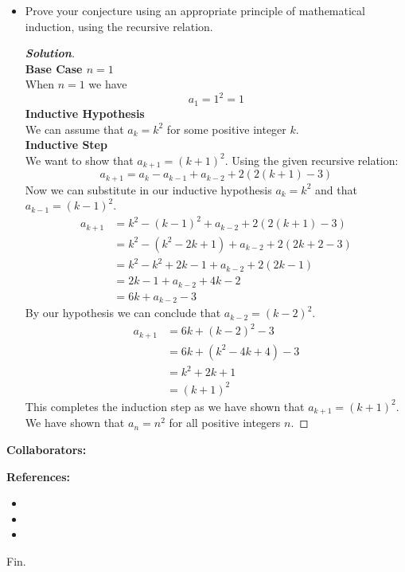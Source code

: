 \documentclass[11pt]{article}
\newenvironment{problem}[2][Problem\!]{\begin{trivlist}
\item[\hskip \labelsep {\bfseries #1}\hskip \labelsep {\bfseries #2.}]}{\end{trivlist}}
\newenvironment{solution}{\begin{proof}[\textbf{\textit{Solution}}]}{\end{proof}}
\begin{document}
\begin{problem}{6.2}
\begin{itemize}[itemsep=3em]
\item[(c)] Prove your conjecture using an appropriate principle of mathematical induction, using the recursive relation.
\begin{solution}\hfill %
\\
\textbf{Base Case \(n = 1\)}\\
When \(n = 1\) we have 
\[a_1 = 1^2 = 1\]
\textbf{Inductive Hypothesis}\\
We can assume that \(a_k = k^2\) for some positive integer \(k\).\\
\textbf{Inductive Step}\\
We want to show that \(a_{k+1} = (k+1)^2\). Using the given recursive relation:
\[a_{k+1} = a_k - a_{k-1} + a_{k-2} + 2(2(k+1)-3)\]
Now we can substitute in our inductive hypothesis \(a_k = k^2\) and that \(a_{k-1} = (k-1)^2\).
\begin{align*}
a_{k+1} &= k^2-(k-1)^2+a_{k-2}+2(2(k+1)-3)\\
&=k^2-(k^2-2k+1)+a_{k-2}+2(2k+2-3)\\
&= k^2-k^2+2k-1+a_{k-2}+2(2k-1)\\
&= 2k - 1 + a_{k-2}+4k-2\\
&= 6k+a_{k-2}-3
\end{align*}
By our hypothesis we can conclude that \(a_{k-2} = (k-2)^2\).
\begin{align*}
    a_{k+1} &= 6k + (k-2)^2 - 3\\
    &= 6k + (k^2-4k+4)-3\\
    &= k^2 + 2k + 1\\
    &= (k+1)^2
\end{align*}
This completes the induction step as we have shown that \(a_{k+1} = (k+1)^2\). We have shown that \(a_n = n^2\) for all positive integers \(n\).
\end{solution}

\end{itemize}
\end{problem}

\newpage  %

\begin{center}
\textbf{Collaborators:}
\end{center}
\vfill 

\begin{center}
\textbf{References:}
\end{center}
\begin{itemize}
\item[$\bullet$] [Book(s): Title, Author]
\item[$\bullet$] [Online: \href{http://example.com/}{Link}]
\item[$\bullet$] [Notes: \href{http://example.com/}{Link}]
\end{itemize}

\vfill
\begin{center}
Fin.
\end{center}
\vfill
\end{document}
